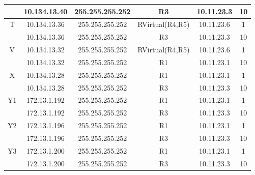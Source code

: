 \documentclass[12pt, a4paper, spanish]{article}
\begin{document}
\begin{center}
\begin{tabular}{|c|c|c|c|c|c|}
	& 10.134.13.40 & 255.255.255.252 & R3 & 10.11.23.3 & 10\\
	\hline
	T & 10.134.13.36 & 255.255.255.252 & RVirtual(R4,R5) & 10.11.23.6 & 1\\
	& 10.134.13.36 & 255.255.255.252 & R3 & 10.11.23.3 & 10\\
	\hline
	V & 10.134.13.32 & 255.255.255.252 & RVirtual(R4,R5) & 10.11.23.6 & 1\\
	& 10.134.13.32 & 255.255.255.252 & R1 & 10.11.23.1 & 10\\
	\hline
	X & 10.134.13.28 & 255.255.255.252 & R1 & 10.11.23.1 & 1\\
	& 10.134.13.28 & 255.255.255.252 & R3 & 10.11.23.3 & 10\\
	\hline
	Y1 & 172.13.1.192 & 255.255.255.252 & R1 & 10.11.23.1 & 1\\
	& 172.13.1.192 & 255.255.255.252 & R3 & 10.11.23.3 & 10\\
	\hline
	Y2 & 172.13.1.196 & 255.255.255.252 & R1 & 10.11.23.1 & 1\\
	& 172.13.1.196 & 255.255.255.252 & R3 & 10.11.23.3 & 10\\
	\hline
	Y3 & 172.13.1.200 & 255.255.255.252 & R1 & 10.11.23.1 & 1\\
	& 172.13.1.200 & 255.255.255.252 & R3 & 10.11.23.3 & 10\\
	\hline
\end{tabular}
\end{center}
\end{document}
